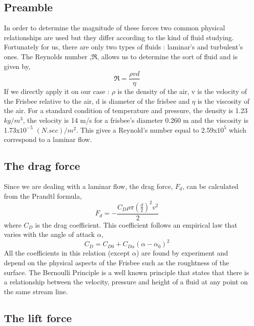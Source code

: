 \documentclass[10pt,a4paper]{report}
\begin{document}
\subsection{Preamble}
In order to determine the magnitude of these forces two common physical relationships are used but they differ according to the kind of fluid studying. Fortunately for us, there are only two types of fluids : laminar's and turbulent's ones. The Reynolds number ,$\Re$, allows us to determine the sort of fluid and is given by,
\[\Re = \frac{\rho v d}{\eta}\]
If we directly apply it on our case : $\rho$ is the density of the air, v is the velocity of the Frisbee relative to the air, d is diameter of the frisbee and $\eta$ is the viscosity of the air. For a standard condition of temperature and pressure, the density is 1.23 $kg/m^3$, the velocity is 14 m/s for a frisbee's diameter 0.260 m and the viscosity is 1.73x$10^{-5}$ $(N.sec)/m^2$. This gives a Reynold's number equal to 2.59x$10^5$ which correspond to a laminar flow.

\subsection{The drag force}

Since we are dealing with a laminar flow, the drag force, $F_d$, can be calculated from the Prandtl formula,
\[F_d = - \frac{C_D \rho \pi \left(\frac{d}{2}\right)^2 v^2}{2}\]
where $C_D$ is the drag coefficient. This coefficient follows an empirical law\cite{art1} that varies with the angle of attack $\alpha$,
\[C_D = C_{D0} + C_{D\alpha}(\alpha-\alpha_0)^2\]
All the coefficients in this relation (except $\alpha$) are found by experiment and depend on the physical aspects of the Frisbee such as the roughtness of the surface.
The Bernoulli Principle is a well known principle that states that there is a relationship between the velocity, pressure and height of a fluid at any point on the same stream line.

\subsection{The lift force}
\end{document}

